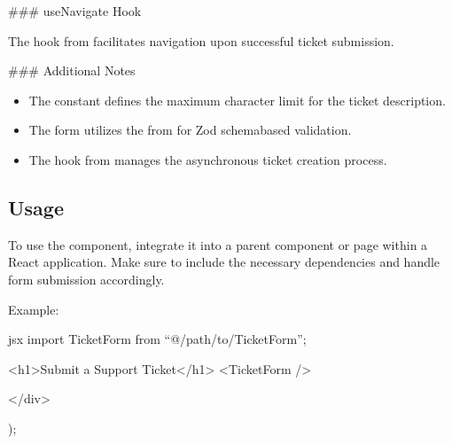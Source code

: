 \documentclass[letterpaper,10pt,english]{sphinxmanual}
\begin{document}
\sphinxAtStartPar
\#\#\# useNavigate Hook

\sphinxAtStartPar
The  hook from  facilitates navigation upon successful ticket submission.

\sphinxAtStartPar
\#\#\# Additional Notes
\begin{itemize}
\item {} 
\sphinxAtStartPar
The  constant defines the maximum character limit for the ticket description.

\item {} 
\sphinxAtStartPar
The form utilizes the  from  for Zod schema\sphinxhyphen{}based validation.

\item {} 
\sphinxAtStartPar
The  hook from  manages the asynchronous ticket creation process.

\end{itemize}


\subsection{Usage}
\label{\detokenize{forms/ticket:usage}}
\sphinxAtStartPar
To use the  component, integrate it into a parent component or page within a React application. Make sure to include the necessary dependencies and handle form submission accordingly.

\sphinxAtStartPar
Example:

\sphinxAtStartPar
{\color{red}\bfseries{}\textasciigrave{}\textasciigrave{}}{\color{red}\bfseries{}\textasciigrave{}}jsx
import TicketForm from “@/path/to/TicketForm”;
\begin{description}
\begin{description}
\begin{description}
\sphinxAtStartPar
\textless{}h1\textgreater{}Submit a Support Ticket\textless{}/h1\textgreater{}
\textless{}TicketForm /\textgreater{}

\end{description}

\sphinxAtStartPar
\textless{}/div\textgreater{}

\end{description}

\sphinxAtStartPar
);

\end{description}
\end{document}
